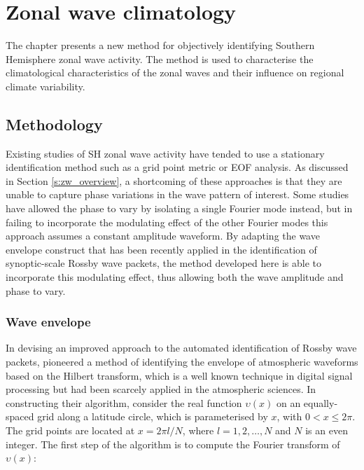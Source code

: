 
\chapter{Zonal wave climatology}\label{c:zw_climatology}


\begin{synopsis}
The chapter presents a new method for objectively identifying Southern Hemisphere zonal wave activity. The method is used to characterise the climatological characteristics of the zonal waves and their influence on regional climate variability.
\end{synopsis}



\section{Methodology}

Existing studies of SH zonal wave activity have tended to use a stationary identification method such as a grid point metric or EOF analysis. As discussed in Section \ref{s:zw_overview}, a shortcoming of these approaches is that they are unable to capture phase variations in the wave pattern of interest. Some studies have allowed the phase to vary by isolating a single Fourier mode instead, but in failing to incorporate the modulating effect of the other Fourier modes this approach assumes a constant amplitude waveform. By adapting the wave envelope construct that has been recently applied in the identification of synoptic-scale Rossby wave packets, the method developed here is able to incorporate this modulating effect, thus allowing both the wave amplitude and phase to vary.
 
 
\subsection{Wave envelope}\label{s:envelope}

In devising an improved approach to the automated identification of Rossby wave packets, \citet{Zimin2003} pioneered a method of identifying the envelope of atmospheric waveforms based on the Hilbert transform, which is a well known technique in digital signal processing but had been scarcely applied in the atmospheric sciences. In constructing their algorithm, \citet{Zimin2003} consider the real function $\upsilon(x)$ on an equally-spaced grid along a latitude circle, which is parameterised by $x$, with $0 < x \leq 2\pi$. The grid points are located at $x = 2 \pi l / N$, where $l = 1, 2, \dotsc, N$ and $N$ is an even integer. The first step of the algorithm is to compute the Fourier transform of $\upsilon(x)$:

